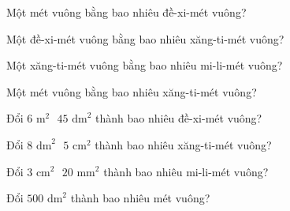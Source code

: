 
\begin{ex}
  Một mét vuông bằng bao nhiêu đề-xi-mét vuông?
\end{ex}

\begin{ex}
  Một đề-xi-mét vuông bằng bao nhiêu xăng-ti-mét vuông?
\end{ex}

\begin{ex}
  Một xăng-ti-mét vuông bằng bao nhiêu mi-li-mét vuông?
\end{ex}

\begin{ex}
  Một mét vuông bằng bao nhiêu xăng-ti-mét vuông?
\end{ex}

\begin{ex}
  Đổi $6\text{ m}^2\text{ } 45\text{ dm}^2$ thành bao nhiêu đề-xi-mét vuông?
\end{ex}

\begin{ex}
  Đổi $8\text{ dm}^2\text{ } 5\text{ cm}^2$ thành bao nhiêu xăng-ti-mét vuông?
\end{ex}

\begin{ex}
  Đổi $3\text{ cm}^2\text{ } 20\text{ mm}^2$ thành bao nhiêu mi-li-mét vuông?
\end{ex}

\begin{ex}
  Đổi $500\text{ dm}^2$ thành bao nhiêu mét vuông?
\end{ex}

